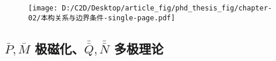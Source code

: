 \begin{figure}[htbp!]
	\centering
	\texttt{[image: D:/C2D/Desktop/article\_fig/phd\_thesis\_fig/chapter-02/本构关系与边界条件-single-page.pdf]}
\end{figure}

\vspace*{-5.5em}

\subsection{$\bar{P},\bar{M}$ 极磁化、$\bar{\bar{Q}},\bar{\bar{N}}$ 多极理论}\label{ssec:PMQN}

